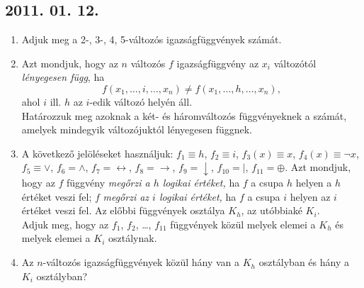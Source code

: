 \subsection*{2011. 01. 12.}
\begin{enumerate}
\item Adjuk meg a 2-, 3-, 4, 5-változós igazságfüggvények számát.
\item Azt mondjuk, hogy az $n$ változós $f$ igazságfüggvény az $x_i$ változótól \emph{lényegesen függ}, ha
\[f(x_1,\ldots,i,\ldots,x_n)\ne f(x_1,\ldots,h,\ldots,x_n),\]
ahol $i$ ill. $h$ az $i$-edik változó helyén áll.\\
Határozzuk meg azoknak a két- és háromváltozós függvényeknek a számát, amelyek mindegyik változójuktól lényegesen függnek.
\item A következő jelöléseket használjuk: $f_1\equiv h$, $f_2\equiv i$, $f_3(x)\equiv x$, $f_4(x)\equiv \neg x$, $f_5\equiv \lor$, $f_6=\land$, $f_7=\leftrightarrow$, $f_8=\to$, $f_9=\downarrow$, $f_{10}=|$, $f_{11}=\oplus$. Azt mondjuk, hogy az $f$ függvény \emph{megőrzi a $h$ logikai értéket,} ha $f$ a csupa $h$ helyen a $h$ értéket veszi fel; $f$ \emph{megőrzi az $i$ logikai értéket,} ha $f$ a csupa $i$ helyen az $i$ értéket veszi fel. Az előbbi függvények osztálya $K_h$, az utóbbiaké $K_i$.\\
Adjuk meg, hogy az $f_1$, $f_2$, \ldots, $f_{11}$ függvények közül melyek elemei a $K_h$ és melyek elemei a $K_i$ osztálynak.
\item Az $n$-változós igazságfüggvények közül hány van a $K_h$ osztályban és hány a $K_i$ osztályban?
\end{enumerate}

